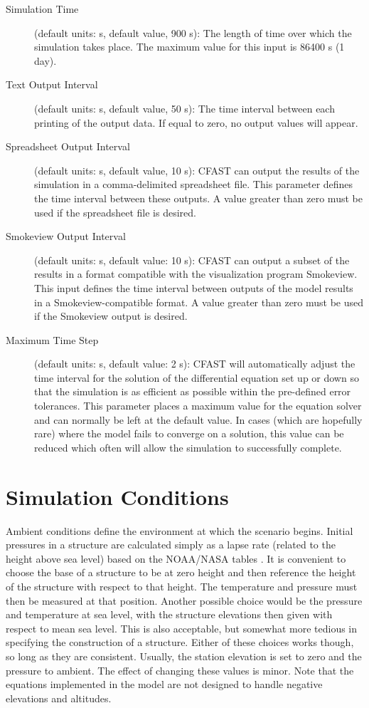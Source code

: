 \begin{description}
\item[Simulation Time] (default units: s, default value, 900 s): The length of time over which the simulation takes place. The maximum value for this input is 86400 s (1 day).

\item[Text Output Interval] (default units: s, default value, 50 s): The time interval between each printing of the output data.  If equal to zero, no output values will appear.

\item[Spreadsheet Output Interval] (default units: s, default value, 10 s): CFAST can output the results of the simulation in a comma-delimited spreadsheet file. This parameter defines the time interval between these outputs. A value greater than zero must be used if the spreadsheet file is desired.

\item[Smokeview Output Interval] (default units: s, default value: 10 s): CFAST can output a subset of the results in a format compatible with the visualization program Smokeview. This input defines the time interval between outputs of the model results in a Smokeview-compatible format.  A value greater than zero must be used if the Smokeview output is desired.

\item[Maximum Time Step] (default units: s, default value: 2 s): CFAST will automatically adjust the time interval for the solution of the differential equation set up or down so that the simulation is as efficient as possible within the pre-defined error tolerances. This parameter places a maximum value for the equation solver and can normally be left at the default value. In cases (which are hopefully rare) where the model fails to converge on a solution, this value can be reduced which often will allow the simulation to successfully complete.
\end{description}

\section{Simulation Conditions}

Ambient conditions define the environment at which the scenario begins. Initial pressures in a structure are calculated simply as a lapse rate (related to the height above sea level) based on the NOAA/NASA tables \cite{GPO:Atmosphere}. It is convenient to choose the base of a structure to be at zero height and then reference the height of the structure with respect to that height.  The temperature and pressure must then be measured at that position.  Another possible choice would be the pressure and temperature at sea level, with the structure elevations then given with respect to mean sea level.  This is also acceptable, but somewhat more tedious in specifying the construction of a structure.  Either of these choices works though, so long as they are consistent. Usually, the station elevation is set to zero and the pressure to ambient. The effect of changing these values is minor. Note that the equations implemented in the model are not designed to handle negative elevations and altitudes.

